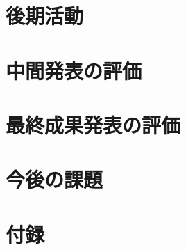 \documentclass[11pt,a4paper,oneside]{jsbook}
\begin{document}
\chapter{後期活動}

\chapter{中間発表の評価}

\chapter{最終成果発表の評価}

\chapter{今後の課題}




\chapter{付録}


%
%
%
\end{document}
